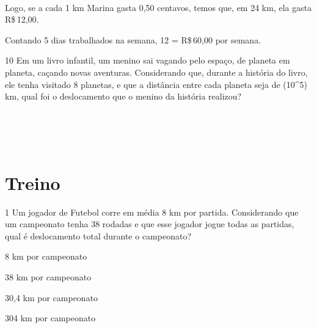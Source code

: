 \\

Logo, se a cada 1 km Marina gasta 0,50 centavos, temos que, em 24 km,
ela gasta R\$\,12,00.

Contando 5 dias trabalhados na semana, 12  = R\$\,60,00 por semana.

\num{10} Em um livro infantil, um menino sai vagando pelo espaço, de planeta
em planeta, caçando novas aventuras. Considerando que, durante a
história do livro, ele tenha visitado 8 planetas, e que a distância
entre cada planeta seja de (10^5) km, qual foi o deslocamento que o
menino da história realizou?

\\
\\
\\

\section{Treino}

\num{1} Um jogador de Futebol corre em média 8 km por partida. Considerando
que um campeonato tenha 38 rodadas e que esse jogador jogue todas as
partidas, qual é deslocamento total durante o campeonato?
\item 8 km por campeonato
\item 38 km por campeonato
\item 30,4 km por campeonato
\item 304 km por campeonato







